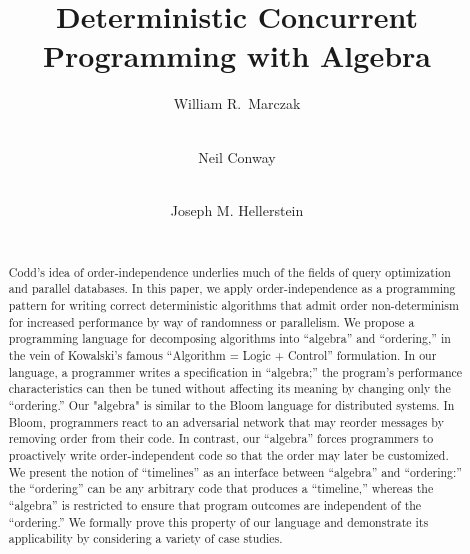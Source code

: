 \documentclass{sig-alternate}
\begin{document}
\title{Deterministic Concurrent Programming with Algebra}


%


\author{
\alignauthor William R.\ Marczak\\
\\
\and
\alignauthor Neil Conway\\
\\
\and
\alignauthor Joseph M. Hellerstein\\
\\
}

\toappear{}

\maketitle

\begin{abstract}
Codd's idea of order-independence underlies much of the fields of query
optimization and parallel databases.  In this paper, we apply
order-independence as a programming pattern for writing correct deterministic algorithms that admit order non-determinism for increased performance by way of randomness or parallelism.
We propose a programming language for decomposing algorithms
into ``algebra'' and ``ordering,'' in the vein of Kowalski's famous ``Algorithm
= Logic + Control'' formulation.  In our language, a programmer writes a
specification in ``algebra;'' the program's performance characteristics can
then be tuned without affecting its meaning by changing only the ``ordering.''
Our
"algebra" is similar to the Bloom language for distributed systems.  In
Bloom, programmers react to an adversarial network that may reorder
messages by removing order from their code.  In contrast, our ``algebra''
forces programmers to proactively write order-independent code so that the
order may later be customized.  We present the notion of ``timelines'' as an
interface between ``algebra'' and ``ordering:'' the ``ordering'' can be any
arbitrary code that produces a ``timeline,'' whereas the ``algebra'' is
restricted to ensure that program outcomes are independent of the
``ordering.''  We formally prove this property of our language and
demonstrate its applicability by considering a variety of case studies.
\end{abstract}









%

\end{document}
